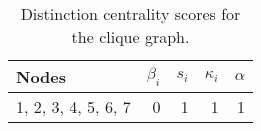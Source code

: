 \begin{table}
\centering
\caption{\label{tab:clique}Distinction centrality scores for the clique graph.}
\centering
\begin{tabular}[t]{lrrrr}
\toprule
Nodes & $\beta_i$ & $s_i$ & $\kappa_i$ & $\alpha$\\
\midrule
1, 2, 3, 4, 5, 6, 7 & 0 & 1 & 1 & 1\\
\bottomrule
\end{tabular}
\end{table}
